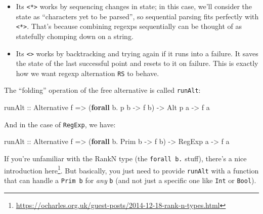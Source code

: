 \documentclass[]{article}
\newenvironment{Shaded}{}{}
\newcommand{\DataTypeTok}[1]{\textcolor[rgb]{0.56,0.13,0.00}{#1}}
\newcommand{\FunctionTok}[1]{\textcolor[rgb]{0.02,0.16,0.49}{#1}}
\newcommand{\KeywordTok}[1]{\textcolor[rgb]{0.00,0.44,0.13}{\textbf{#1}}}
\newcommand{\NormalTok}[1]{#1}
\newcommand{\OtherTok}[1]{\textcolor[rgb]{0.00,0.44,0.13}{#1}}
\renewcommand{\href}[2]{#2\footnote{\url{#1}}}
\begin{document}
\begin{itemize}
\tightlist
\item
  Its \texttt{\textless{}*\textgreater{}} works by sequencing changes in state;
  in this case, we'll consider the state as ``characters yet to be parsed'', so
  sequential parsing fits perfectly with \texttt{\textless{}*\textgreater{}}.
  That's because combining regexps sequentially can be thought of as statefully
  chomping down on a string.
\item
  Its \texttt{\textless{}\textbar{}\textgreater{}} works by backtracking and
  trying again if it runs into a failure. It saves the state of the last
  successful point and resets to it on failure. This is exactly how we want
  regexp alternation \texttt{R\textbar{}S} to behave.
\end{itemize}

The ``folding'' operation of the free alternative is called \texttt{runAlt}:

\begin{Shaded}
\begin{Highlighting}[]
\OtherTok{runAlt ::} \DataTypeTok{Alternative}\NormalTok{ f}
       \OtherTok{=>}\NormalTok{ (}\KeywordTok{forall}\NormalTok{ b}\FunctionTok{.}\NormalTok{ p b }\OtherTok{->}\NormalTok{ f b)}
       \OtherTok{->} \DataTypeTok{Alt}\NormalTok{ p a}
       \OtherTok{->}\NormalTok{ f a}
\end{Highlighting}
\end{Shaded}

And in the case of \texttt{RegExp}, we have:

\begin{Shaded}
\begin{Highlighting}[]
\OtherTok{runAlt ::} \DataTypeTok{Alternative}\NormalTok{ f}
       \OtherTok{=>}\NormalTok{ (}\KeywordTok{forall}\NormalTok{ b}\FunctionTok{.} \DataTypeTok{Prim}\NormalTok{ b }\OtherTok{->}\NormalTok{ f b)}
       \OtherTok{->} \DataTypeTok{RegExp}\NormalTok{ a}
       \OtherTok{->}\NormalTok{ f a}
\end{Highlighting}
\end{Shaded}

If you're unfamiliar with the RankN type (the \texttt{forall\ b.} stuff),
there's a
\href{https://ocharles.org.uk/guest-posts/2014-12-18-rank-n-types.html}{nice
introduction here}. But basically, you just need to provide \texttt{runAlt} with
a function that can handle a \texttt{Prim\ b} for \emph{any} \texttt{b} (and not
just a specific one like \texttt{Int} or \texttt{Bool}).
\end{document}

